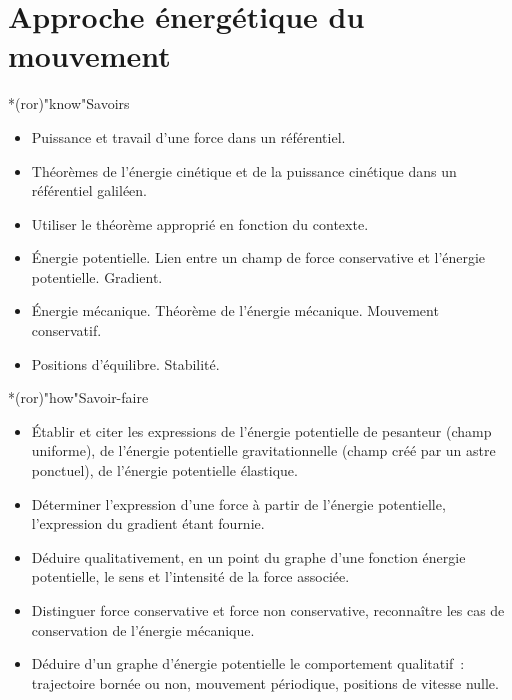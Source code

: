 \documentclass[../../main/main.tex]{subfiles}
\begin{document}
\setcounter{chapter}{3}

\chapter{Approche \'energ\'etique du mouvement}

\vspace*{\fill}

\begin{prgm}
	\begin{tcb}*(ror)"know"{Savoirs}
		\begin{itemize}
			\item Puissance et travail d’une force dans un référentiel.
			\item Théorèmes de l’énergie cinétique et de la puissance cinétique dans
			      un référentiel galiléen.
			\item Utiliser le théorème approprié en fonction du contexte.
			\item Énergie potentielle. Lien entre un champ de force conservative et
			      l’énergie potentielle. Gradient.
			\item Énergie mécanique. Théorème de l’énergie mécanique. Mouvement
			      conservatif.
			\item Positions d’équilibre. Stabilité.
		\end{itemize}
	\end{tcb}
	\begin{tcb}*(ror)"how"{Savoir-faire}
		\begin{itemize}
			\item Établir et citer les expressions de l’énergie potentielle de
			      pesanteur (champ uniforme), de l’énergie potentielle
			      gravitationnelle (champ créé par un astre ponctuel), de l’énergie
			      potentielle élastique.

			\item Déterminer l’expression d’une force à partir de l’énergie
			      potentielle, l’expression du gradient étant fournie.

			\item Déduire qualitativement, en un point du graphe d’une fonction
			      énergie potentielle, le sens et l’intensité de la force associée.

			\item Distinguer force conservative et force non conservative, reconnaître
			      les cas de conservation de l'énergie mécanique.

			\item Déduire d’un graphe d’énergie potentielle le comportement
			      qualitatif~: trajectoire bornée ou non, mouvement périodique,
			      positions de vitesse nulle.


\end{itemize}
\end{tcb}
\end{prgm}
\end{document}
